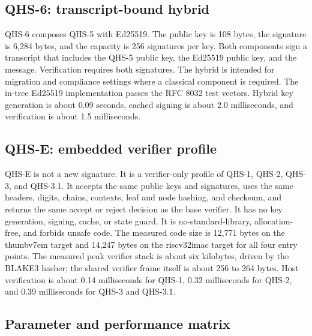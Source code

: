 \documentclass[11pt,a4paper]{article}
\begin{document}
\subsection{QHS-6: transcript-bound hybrid}

QHS-6 composes QHS-5 with Ed25519. The public key is 108 bytes, the signature
is 6,284 bytes, and the capacity is 256 signatures per key. Both components
sign a transcript that includes the QHS-5 public key, the Ed25519 public key,
and the message. Verification requires both signatures. The hybrid is intended
for migration and compliance settings where a classical component is required.
The in-tree Ed25519 implementation passes the RFC 8032 test vectors. Hybrid key
generation is about 0.09 seconds, cached signing is about 2.0 milliseconds, and
verification is about 1.5 milliseconds.

\subsection{QHS-E: embedded verifier profile}

QHS-E is not a new signature. It is a verifier-only profile of QHS-1, QHS-2,
QHS-3, and QHS-3.1. It accepts the same public keys and signatures, uses the
same headers, digits, chains, contexts, leaf and node hashing, and checksum, and
returns the same accept or reject decision as the base verifier. It has no key
generation, signing, cache, or state guard. It is no-standard-library,
allocation-free, and forbids unsafe code. The measured code size is 12,771
bytes on the thumbv7em target and 14,247 bytes on the riscv32imac target for
all four entry points. The measured peak verifier stack is about six kilobytes,
driven by the BLAKE3 hasher; the shared verifier frame itself is about 256 to
264 bytes. Host verification is about 0.14 milliseconds for QHS-1, 0.32
milliseconds for QHS-2, and 0.39 milliseconds for QHS-3 and QHS-3.1.

\subsection{Parameter and performance matrix}
\end{document}
